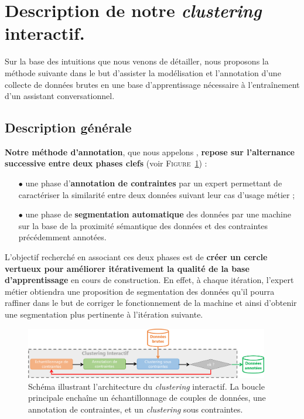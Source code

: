\section{Description de notre \textit{clustering} interactif.}
\label{section:3.2-DESCRIPTION-THEORIQUE}

	Sur la base des intuitions que nous venons de détailler, nous proposons la méthode suivante dans le but d'assister la modélisation et l'annotation d'une collecte de données brutes en une base d'apprentissage nécessaire à l'entraînement d'un assistant conversationnel.
	
	\subsection{Description générale}
	\label{section:3.2.1-DESCRIPTION-THEORIQUE-GENERALE}
	
		\textbf{Notre méthode d'annotation}, que nous appelons , \textbf{repose sur l'alternance successive entre deux phases clefs} (voir \textsc{Figure~\ref{figure:3.2-CLUSTERING-INTERACTIF}}) :
		\begin{itemize}
			\item[\(\bullet\)] une phase d'\textbf{annotation de contraintes}
			par un expert permettant de caractériser la similarité entre deux données suivant leur cas d'usage métier ;
			\item[\(\bullet\)] une phase de \textbf{segmentation automatique} des données
			par une machine sur la base de la proximité sémantique des données et des contraintes précédemment annotées.
		\end{itemize}
		
		L'objectif recherché en associant ces deux phases est de \textbf{créer un cercle vertueux pour améliorer itérativement la qualité de la base d'apprentissage} en cours de construction.
		En effet, à chaque itération, l'expert métier obtiendra une proposition de segmentation des données qu'il pourra raffiner dans le but de corriger le fonctionnement de la machine et ainsi d'obtenir une segmentation plus pertinente à l'itération suivante.
		
		\begin{figure}[!htb]
			\centering
			\includegraphics[width=0.95\textwidth]{figures/interactive-clustering-architecture-sequentielle}
			\caption{
				Schéma illustrant l'architecture du \textit{clustering} interactif.
				La boucle principale enchaîne un échantillonnage de couples de données, une annotation de contraintes, et un \textit{clustering} sous contraintes.
			}
			\label{figure:3.2-CLUSTERING-INTERACTIF}
		\end{figure}
	
